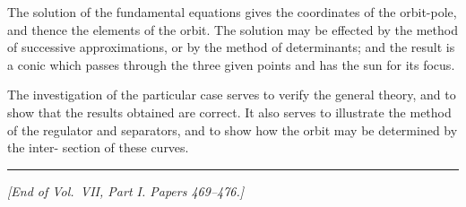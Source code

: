\documentclass[11pt,a4paper]{article}
\theoremstyle{definition}
\begin{document}
The solution of the fundamental equations gives the coordinates of the orbit-pole, and
thence the elements of the orbit. The solution may be effected by the method of successive
approximations, or by the method of determinants; and the result is a conic which
passes through the three given points and has the sun for its focus.

The investigation of the particular case serves to verify the general theory, and to
show that the results obtained are correct. It also serves to illustrate the method of the
regulator and separators, and to show how the orbit may be determined by the inter-
section of these curves.

\hfill\rule{1.5cm}{0.4pt}

\vfill
\begin{center}
\textit{[End of Vol.~VII, Part I. Papers 469--476.]}
\end{center}
\end{document}
